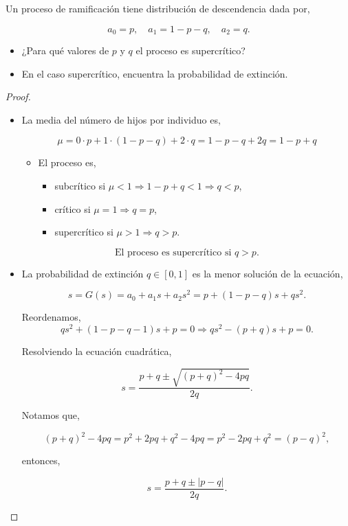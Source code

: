 \documentclass{article}
\begin{document}
Un proceso de ramificación tiene distribución de descendencia dada por,

\[
a_0 = p, \quad a_1 = 1 - p - q, \quad a_2 = q.
\]

\begin{itemize}
\item[(a)] ¿Para qué valores de \( p \) y \( q \) el proceso es supercrítico?
\item[(b)] En el caso supercrítico, encuentra la probabilidad de extinción.
\end{itemize}

\begin{proof}
\begin{itemize}
\item[(a)] 

La media del número de hijos por individuo es,

\[
\mu = 0 \cdot p + 1 \cdot (1 - p - q) + 2 \cdot q = 1 - p - q + 2q = 1 - p + q
\]

\begin{itemize}
\item El proceso es,
  \begin{itemize}
  \item subcrítico si \( \mu < 1 \Rightarrow 1 - p + q < 1 \Rightarrow q < p \),
  \item crítico si \( \mu = 1 \Rightarrow q = p \),
  \item supercrítico si \( \mu > 1 \Rightarrow q > p \).
  \end{itemize}
\end{itemize}

\[
    \text{El proceso es supercrítico si } q > p.
\]

\item[(b)]
La probabilidad de extinción \( q \in [0,1] \) es la menor solución de la ecuación,

\[
s = G(s) = a_0 + a_1 s + a_2 s^2 = p + (1 - p - q)s + q s^2.
\]

Reordenamos,
\[
q s^2 + (1 - p - q - 1)s + p = 0 \Rightarrow q s^2 - (p + q) s + p = 0.
\]

Resolviendo la ecuación cuadrática,

\[
s = \frac{p + q \pm \sqrt{(p + q)^2 - 4pq}}{2q}.
\]

Notamos que,

\[
(p + q)^2 - 4pq = p^2 + 2pq + q^2 - 4pq = p^2 - 2pq + q^2 = (p - q)^2,
\]

entonces,

\[
s = \frac{p + q \pm |p - q|}{2q}.
\]


\end{itemize}
\end{proof}
\end{document}
